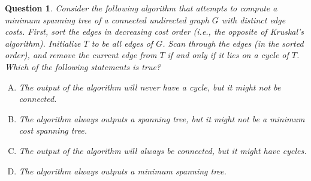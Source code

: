 \documentclass{article}
\newtheorem{Q}{Question}
\begin{document}

\begin{Q}
	Consider the following algorithm that attempts to compute a minimum spanning tree of a connected undirected graph $G$ with distinct edge costs. First, sort the edges in decreasing cost order (i.e., the opposite of Kruskal’s algorithm). Initialize $T$ to be all edges of $G$. Scan through the edges (in the sorted order), and remove the current edge from $T$ if and only if it lies on a cycle of $T$.\\	
	Which of the following statements is true?
	\begin{enumerate}[(A)]
		\item The output of the algorithm will never have a cycle, but it might not be connected.
		\item The algorithm always outputs a spanning tree, but it might not be a minimum cost spanning tree.
		\item The output of the algorithm will always be connected, but it might have cycles.
		\item The algorithm always outputs a minimum spanning tree.
	\end{enumerate} 
\end{Q}
\end{document}
